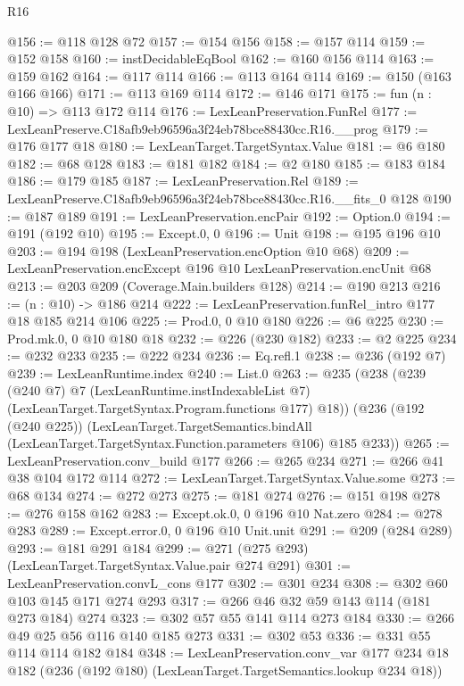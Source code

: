 \begin{lexlean}{R16}
\begin{coremodule}
@156 := @118 @128 @72
@157 := @154 @156
@158 := @157 @114
@159 := @152 @158
@160 := instDecidableEqBool
@162 := @160 @156 @114
@163 := @159 @162
@164 := @117 @114
@166 := @113 @164 @114
@169 := @150 (@163 @166 @166)
@171 := @113 @169 @114
@172 := @146 @171
@175 := fun (n : @10) => @113 @172 @114
@176 := LexLeanPreservation.FunRel
@177 := LexLeanPreserve.C18afb9eb96596a3f24eb78bce88430cc.R16.__prog
@179 := @176 @177 @18
@180 := LexLeanTarget.TargetSyntax.Value
@181 := @6 @180
@182 := @68 @128
@183 := @181 @182
@184 := @2 @180
@185 := @183 @184
@186 := @179 @185
@187 := LexLeanPreservation.Rel
@189 := LexLeanPreserve.C18afb9eb96596a3f24eb78bce88430cc.R16.__fits_0 @128
@190 := @187 @189
@191 := LexLeanPreservation.encPair
@192 := Option.{0}
@194 := @191 (@192 @10)
@195 := Except.{0, 0}
@196 := Unit
@198 := @195 @196 @10
@203 := @194 @198 (LexLeanPreservation.encOption @10 @68)
@209 := LexLeanPreservation.encExcept @196 @10 LexLeanPreservation.encUnit @68
@213 := @203 @209 (Coverage.Main.builders @128)
@214 := @190 @213
@216 := (n : @10) -> @186 @214
@222 := LexLeanPreservation.funRel_intro @177 @18 @185 @214 @106
@225 := Prod.{0, 0} @10 @180
@226 := @6 @225
@230 := Prod.mk.{0, 0} @10 @180 @18
@232 := @226 (@230 @182)
@233 := @2 @225
@234 := @232 @233
@235 := @222 @234
@236 := Eq.refl.{1}
@238 := @236 (@192 @7)
@239 := LexLeanRuntime.index
@240 := List.{0}
@263 := @235
    (@238
      (@239
        (@240 @7)
        @7
        (LexLeanRuntime.instIndexableList @7)
        (LexLeanTarget.TargetSyntax.Program.functions @177)
        @18))
    (@236
      (@192 (@240 @225))
      (LexLeanTarget.TargetSemantics.bindAll
        (LexLeanTarget.TargetSyntax.Function.parameters @106)
        @185
        @233))
@265 := LexLeanPreservation.conv_build @177
@266 := @265 @234
@271 := @266 @41 @38 @104 @172 @114
@272 := LexLeanTarget.TargetSyntax.Value.some
@273 := @68 @134
@274 := @272 @273
@275 := @181 @274
@276 := @151 @198
@278 := @276 @158 @162
@283 := Except.ok.{0, 0} @196 @10 Nat.zero
@284 := @278 @283
@289 := Except.error.{0, 0} @196 @10 Unit.unit
@291 := @209 (@284 @289)
@293 := @181 @291 @184
@299 := @271 (@275 @293) (LexLeanTarget.TargetSyntax.Value.pair @274 @291)
@301 := LexLeanPreservation.convL_cons @177
@302 := @301 @234
@308 := @302 @60 @103 @145 @171 @274 @293
@317 := @266 @46 @32 @59 @143 @114 (@181 @273 @184) @274
@323 := @302 @57 @55 @141 @114 @273 @184
@330 := @266 @49 @25 @56 @116 @140 @185 @273
@331 := @302 @53
@336 := @331 @55 @114 @114 @182 @184
@348 := LexLeanPreservation.conv_var
    @177
    @234
    @18
    @182
    (@236 (@192 @180) (LexLeanTarget.TargetSemantics.lookup @234 @18))

\end{coremodule}
\end{lexlean}
